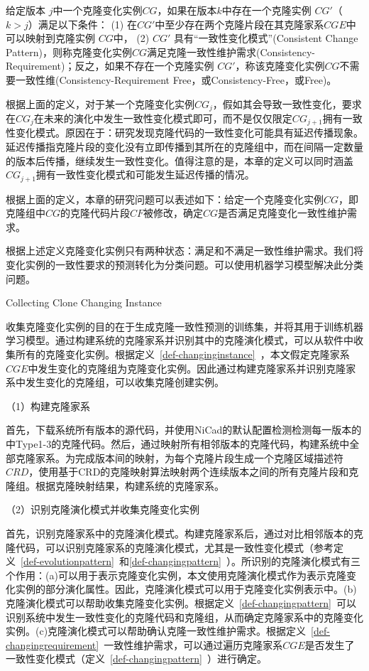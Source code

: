\begin{definition}[克隆变化时一致性维护需求] 
 \label{def-changingrequirement}
给定版本 $j$中一个克隆变化实例$CG$，如果在版本$k$中存在一个克隆实例 $CG'$（$k>j$）满足以下条件： (1) 在$CG'$中至少存在两个克隆片段在其克隆家系$CGE$中可以映射到克隆实例 $CG$中， (2) $CG'$ 具有“一致性变化模式”(Consistent Change Pattern)，则称克隆变化实例$CG$满足克隆一致性维护需求(Consistency-Requirement)；反之，如果不存在一个克隆实例 $CG'$，称该克隆变化实例$CG$不需要一致性维(Consistency-Requirement Free，或Consistency-Free，或Free)。
\end{definition}

根据上面的定义，对于某一个克隆变化实例$CG_j$，假如其会导致一致性变化，要求在$CG_j$在未来的演化中发生一致性变化模式即可，而不是仅仅限定$CG_{j+1}$拥有一致性变化模式。原因在于：研究发现克隆代码的一致性变化可能具有延迟传播现象\cite{barbour2011late,mondal2016comparative}。延迟传播指克隆片段的变化没有立即传播到其所在的克隆组中，而在间隔一定数量的版本后传播，继续发生一致性变化。值得注意的是，本章的定义可以同时涵盖$CG_{j+1}$拥有一致性变化模式和可能发生延迟传播的情况。

根据上面的定义，本章的研究问题可以表述如下：给定一个克隆变化实例$CG$，即克隆组中$CG$的克隆代码片段$CF$被修改，确定$CG$是否满足克隆变化一致性维护需求。

根据上述定义克隆变化实例只有两种状态：满足和不满足一致性维护需求。我们将变化实例的一致性要求的预测转化为分类问题。可以使用机器学习模型解决此分类问题。

{Collecting Clone Changing Instance}

收集克隆变化实例的目的在于生成克隆一致性预测的训练集，并将其用于训练机器学习模型。通过构建系统的克隆家系并识别其中的克隆演化模式，可以从软件中收集所有的克隆变化实例。根据定义~\ref{def-changinginstance}~，本文假定克隆家系$CGE$中发生变化的克隆组为克隆变化实例。因此通过构建克隆家系并识别克隆家系中发生变化的克隆组，可以收集克隆创建实例。

（1）构建克隆家系

首先，下载系统所有版本的源代码，并使用NiCad的默认配置检测检测每一版本的中Type1-3的克隆代码。然后，通过映射所有相邻版本的克隆代码，构建系统中全部克隆家系。为完成版本间的映射，为每个克隆片段生成一个克隆区域描述符 $CRD$\cite{duala2010clone}，使用基于CRD的克隆映射算法映射两个连续版本之间的所有克隆片段和克隆组\cite{ci2013new,ci2013newD}。根据克隆映射结果，构建系统的克隆家系。

（2）识别克隆演化模式并收集克隆变化实例

首先，识别克隆家系中的克隆演化模式。构建克隆家系后，通过对比相邻版本的克隆代码，可以识别克隆家系的克隆演化模式，尤其是一致性变化模式（参考定义~\ref{def-evolutionpattern}~和\ref{def-changingpattern}~）。所识别的克隆演化模式有三个作用：(a)可以用于表示克隆变化实例，本文使用克隆演化模式作为表示克隆变化实例的部分演化属性。因此，克隆演化模式可以用于克隆变化实例表示中。(b)克隆演化模式可以帮助收集克隆变化实例。根据定义~\ref{def-changingpattern}~可以识别系统中发生一致性变化的克隆代码和克隆组，从而确定克隆家系中的克隆变化实例。(c)克隆演化模式可以帮助确认克隆一致性维护需求。根据定义~\ref{def-changingrequirement}~一致性维护需求，可以通过遍历克隆家系$CGE$是否发生了一致性变化模式（定义~\ref{def-changingpattern}~）进行确定。

